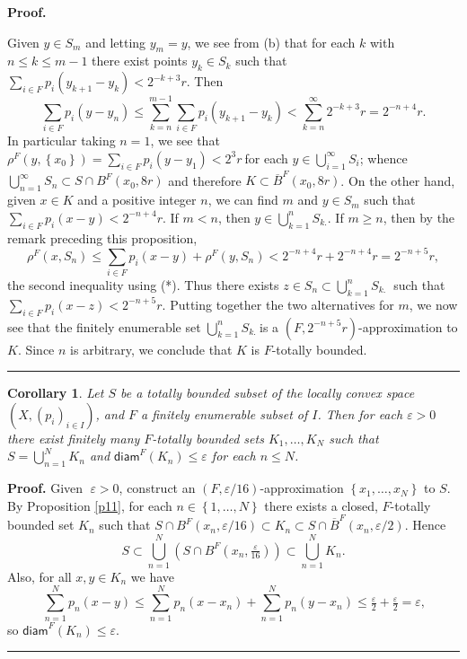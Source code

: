 \documentclass{article}%
\newtheorem{corollary}[theorem]{Corollary}
\newenvironment{proof}[1][Proof]{\noindent\textbf{#1.} }{\ \rule{0.5em}{0.5em}}
\begin{document}
\begin{proof}
%

\noindent
Given $y\in S_{m}$ and letting $y_{m}=y$, we see from (b) that for each $k$
with $n\leq k\leq m-1$ there exist points $y_{k}\in S_{k}$ such that
$\sum_{i\in F}p_{i}(y_{k+1}-y_{k})<2^{-k+3}r$. Then%
\[
\sum_{i\in F}p_{i}(y-y_{n})\leqslant\sum_{k=n}^{m-1}\sum_{i\in F}p_{i}%
(y_{k+1}-y_{k})<\sum_{k=n}^{\infty}2^{-k+3}r=2^{-n+4}r.
\]
In particular taking $n=1$, we see that $\rho^{F}(y,\left\{  x_{0}\right\}
)=\sum_{i\in F}p_{i}(y-y_{1})<2^{3}r~$for each $y\in\bigcup\limits_{i=1}%
^{\infty}S_{i}$; whence $\bigcup\limits_{n=1}^{\infty}S_{n}\subset S\cap
B^{F}(x_{0},8r)$ and therefore $K\subset\overline{B}^{F}(x_{0},8r)$. On the
other hand, given $x\in K$ and a positive integer $n$, we can find $m$ and
$y\in S_{m}$ such that $\sum_{i\in F}p_{i}(x-y)<2^{-n+4}r$. If $m<n$, then
$y\in\bigcup\limits_{k=1}^{n}S_{k\text{.}}$. If $m\geq n$, then by the remark
preceding this proposition,%
\[
\rho^{F}(x,S_{n})\leqslant\sum_{i\in F}p_{i}(x-y)+\rho^{F}(y,S_{n}%
)<2^{-n+4}r+2^{-n+4}r=2^{-n+5}r,
\]
the second inequality using (*). Thus there exists $z\in S_{n}\subset
\bigcup\limits_{k=1}^{n}S_{k\text{. }}$ such that $\sum_{i\in F}%
p_{i}(x-z)<2^{-n+5}r$. Putting together the two alternatives for $m$, we now
see that the finitely enumerable set $\bigcup\limits_{k=1}^{n}S_{k\text{. }}%
$is a $\left(  F,2^{-n+5}r\right)  $-approximation to $K$. Since $n$ is
arbitrary, we conclude that $K$ is $F$-totally bounded.
\end{proof}

\begin{corollary}
\label{c11}Let $S$ be a totally bounded subset of the locally convex space
$\left(  X,\left(  p_{i}\right)  _{i\in I}\right)  $, and $F$ a finitely
enumerable subset of $I$. Then for each $\varepsilon>0$ there exist finitely
many $F$-totally bounded sets $K_{1},\ldots,K_{N}$ such that $S=%
{\textstyle\bigcup_{n=1}^{N}}
K_{n}$ and $\mathsf{diam}^{F}(K_{n})\leq\varepsilon$ for each $n\leq N$.
\end{corollary}

\begin{proof}
Given\textbf{\emph{\ }}$\varepsilon>0$, construct an $\left(  F,\varepsilon
/16\right)  $-approximation $\left\{  x_{1},\ldots,x_{N}\right\}  $ to $S$. By
Proposition \ref{p11}, for each $n\in\left\{  1,\ldots,N\right\}  $ there
exists a closed, $F$-totally bounded set $K_{n}$ such that $S\cap B^{F}%
(x_{n},\varepsilon/16)\subset K_{n}\subset S\cap\overline{B}^{F}%
(x_{n},\varepsilon/2)$. Hence
\[
S\subset\bigcup_{n=1}^{N}\left(  S\cap B^{F}\left(  x_{n},\tfrac{\varepsilon
}{16}\right)  \right)  \subset%
{\textstyle\bigcup_{n=1}^{N}}
K_{n}.
\]
Also, for all $x,y\in K_{n}$ we have%
\[
\sum_{n=1}^{N}p_{n}(x-y)\leq\sum_{n=1}^{N}p_{n}(x-x_{n})+\sum_{n=1}^{N}%
p_{n}(y-x_{n})\leq\tfrac{\varepsilon}{2}+\tfrac{\varepsilon}{2}=\varepsilon
\text{,}%
\]
so $\mathsf{diam}^{F}(K_{n})\leq\varepsilon$.
\end{proof}
\end{document}
